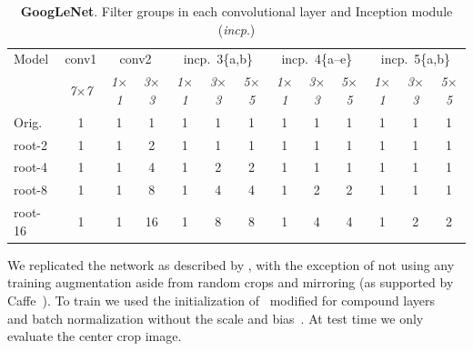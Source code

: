 \documentclass[thesis]{subfiles}
\begin{document}
	\begin{table}[tp]
		\caption[GoogLeNet root architectures]{\textbf{GoogLeNet}. Filter groups in each convolutional layer and Inception module (\textit{incp}.)}
		\label{table:googlenetconfig}
		\centering
		\begin{tabular}{@{}lcccccccccccc@{}}
			\toprule
			Model & conv1 & \multicolumn{2}{c}{conv2} & \multicolumn{3}{c}{incp.~3\{a,b\}} & \multicolumn{3}{c}{incp.~4\{a--e\}} & \multicolumn{3}{c}{incp.~5\{a,b\}} \\
			& \textit{\footnotesize7$\times$7} & \textit{\footnotesize1$\times$1} & \textit{\footnotesize3$\times$3} & \textit{\footnotesize1$\times$1} & \textit{\footnotesize3$\times$3} & \textit{\footnotesize5$\times$5} & \textit{\footnotesize1$\times$1} & \textit{\footnotesize3$\times$3} & \textit{\footnotesize5$\times$5} & \textit{\footnotesize1$\times$1} & \textit{\footnotesize3$\times$3} & \textit{\footnotesize5$\times$5} \\
			Orig. & 1 &  1 &  1 & 1 & 1 & 1 & 1 & 1 & 1 & 1 & 1 & 1\\ 
			\midrule
			root-2 & 1 &  1 &  2 & 1 & 1 & 1 & 1 & 1 & 1 & 1 & 1 & 1\\
			root-4 & 1 &  1 &  4 & 1 & 2 & 2 & 1 & 1 & 1 & 1 & 1 & 1\\
			root-8 & 1 &  1 &  8 & 1 & 4 & 4 & 1 & 2 & 2 & 1 & 1 & 1\\
			root-16 & 1 &  1 & 16 & 1 & 8 & 8 & 1 & 4 & 4 & 1 & 2 & 2\\
			\bottomrule
		\end{tabular}
	\end{table}
	
	We replicated the network as described by \citet{Szegedy2014going}, with the exception of not using any training augmentation aside from random crops and mirroring (as supported by Caffe~\citep{Jia2014}). To train we used the initialization of~\citep{He2015b} modified for compound layers~\citep{Ioannou2016} and batch normalization without the scale and bias~\citep{Ioffe2015}. At test time we only evaluate the center crop image.
	
\end{document}
